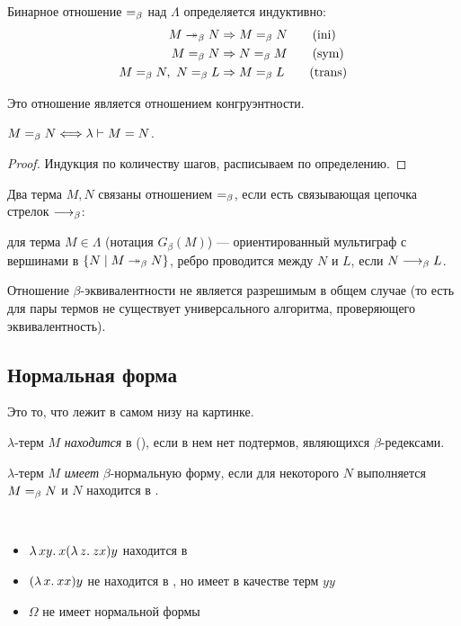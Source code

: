 \documentclass[11pt,a4paper]{article}
\begin{document}
\begin{defn}[Конвертируемость]
	Бинарное отношение  $ =_{\beta}$ над $ \Lambda$ определяется индуктивно:
	\begin{align*}
		M \twoheadrightarrow_{\beta} N & \Rightarrow  M =_{\beta} N \tag{ini}\\
		M =_{\beta} N & \Rightarrow  N =_{\beta} M \tag{sym}\\
		M =_{\beta} N, ~ N =_{\beta} L & \Rightarrow  M =_{\beta} L \tag{trans}
	\end{align*}
\end{defn}
Это отношение является отношением конгруэнтности.

\begin{st}
    $ M =_{\beta} N \Longleftrightarrow \lambda \vdash M = N$.
\end{st}
\begin{proof}
	Индукция по количеству шагов, расписываем по определению.
\end{proof}
Два терма $ M, N$ связаны отношением $ =_{\beta}$, если есть связывающая цепочка стрелок $ \longrightarrow_{\beta}$:
\begin{figure}[ht]
    \centering
    \label{fig:beta-equiv}
\end{figure}

 для терма $ M \in \Lambda$ (нотация $ G_{\beta}(M)$) --- ориентированный мультиграф с вершинами в $ \{N \mid M \twoheadrightarrow_{\beta} N\}$, ребро проводится между $ N$ и $ L$, если  $ N \longrightarrow_{\beta} L$.

Отношение $ \beta $-эквивалентности не является разрешимым в общем случае (то есть для пары термов не существует универсального алгоритма, проверяющего эквивалентность).

\subsection{Нормальная форма}
Это то, что лежит в самом низу на картинке.
\begin{defn}
$ \lambda$-терм $ M$ \textit{находится} в  (\bNF), если в нем нет подтермов, являющихся  $ \beta $-редексами.

\noindent
$ \lambda$-терм $ M$ \textit{имеет} $\beta $-нормальную форму, если для некоторого $ N$ выполняется $ M =_{\beta} N$ и $ N$ находится в \bNF.
\end{defn}
\begin{ex}
	~\begin{itemize}
		\item $ \lambda\,{xy}.\:{x(\lambda\,{z}.\:{zx})y}$ находится в \bNF
		\item $ (\lambda\,{x}.\:{xx})y$ не находится в \bNF, но имеет в качестве \bNF терм $ yy$
		\item $ \Omega $ не имеет нормальной формы
    \end{itemize}
\end{ex}
\end{document}
